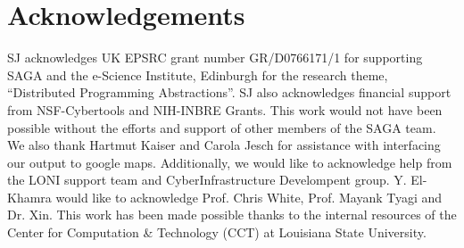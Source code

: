 \documentclass[conference,final]{IEEEtran}
\begin{document}





\section{Acknowledgements}
SJ acknowledges UK EPSRC grant number GR/D0766171/1 for supporting
SAGA and the e-Science Institute, Edinburgh for the research theme,
``Distributed Programming Abstractions''.  SJ also acknowledges
financial support from NSF-Cybertools and NIH-INBRE Grants. This work
would not have been possible without the efforts and support of other
members of the SAGA team.  We also thank Hartmut Kaiser and Carola
Jesch for assistance with interfacing our output to google
maps. Additionally, we would like to acknowledge help from the LONI
support team and CyberInfrastructure Develompent group.  Y. El-Khamra
would like to acknowledge Prof. Chris White, Prof. Mayank Tyagi and
Dr. Xin. This work has been made possible thanks to the internal
resources of the Center for Computation \& Technology (CCT) at
Louisiana State University.  



\end{document}
